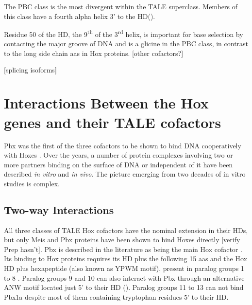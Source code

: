 The PBC class is the most divergent within the \ac{TALE} superclass. Members of this class have a fourth alpha helix 3' to the \ac{HD}(\cite{Mukherjee2007}). 

Residue 50 of the \ac{HD}, the 9\textsuperscript{th} of the 3\textsuperscript{rd} helix, is important for base selection by contacting the major groove of DNA and is a glicine in the PBC class, in contrast to the long side chain \acp{aa} in Hox proteins. [other cofactors?]

[splicing isoforms]

\section{Interactions Between the Hox genes and their TALE cofactors}
\label{sec:interactions}

Pbx was the first of the three cofactors to be shown to bind DNA cooperatively with Hoxes \cite{Chan1994}. Over the years, a number of protein complexes involving two or more partners binding on the surface of DNA or independent of it have been described \textit{in vitro} and \textit{in vivo}. The picture emerging from two decades of in vitro studies is complex. 

\subsection{Two-way Interactions}

All three classes of \ac{TALE} Hox cofactors have the nominal extension in their \acp{HD}, but only Meis and Pbx proteins have been shown to bind Hoxes directly [verify Prep hasn't]. Pbx is described in the literature as being the main Hox cofactor \cite{ref}. Its binding to Hox proteins requires its \ac{HD} plus the following 15 \acp{aa} and the Hox \ac{HD} plus hexapeptide (also known as YPWM motif), present in paralog groups 1 to 8 \cite{Chang1995, Passner1999}. Paralog groups 9 and 10 can also interact with Pbx through an alternative ANW motif located just 5' to their \ac{HD} (\cite{Chang1996, Shen1997a}). Paralog groups 11 to 13 can not bind Pbx1a despite most of them containing tryptophan residues 5' to their \ac{HD}. 

